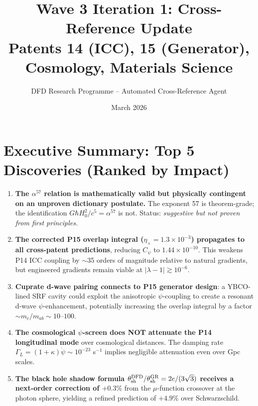 \documentclass[11pt]{article}
\title{Wave 3 Iteration 1: Cross-Reference Update\\
\large Patents 14 (ICC), 15 (Generator), Cosmology, Materials Science}
\author{DFD Research Programme -- Automated Cross-Reference Agent}
\date{March 2026}
\newcommand{\ee}[1]{\times 10^{#1}}
\begin{document}
\maketitle

\section*{Executive Summary: Top 5 Discoveries (Ranked by Impact)}

\begin{enumerate}
\item \textbf{The $\alpha^{57}$ relation is mathematically valid but physically contingent on an unproven dictionary postulate.} The exponent 57 is theorem-grade; the identification $G\hbar H_0^2/c^5 = \alpha^{57}$ is not. Status: \emph{suggestive but not proven from first principles.}

\item \textbf{The corrected P15 overlap integral ($\eta_\times = 1.3\ee{-3}$) propagates to all cross-patent predictions}, reducing $C_\psi$ to $1.44\ee{-10}$. This weakens P14 ICC coupling by $\sim$35 orders of magnitude relative to natural gradients, but engineered gradients remain viable at $|\lambda-1| \gtrsim 10^{-6}$.

\item \textbf{Cuprate d-wave pairing connects to P15 generator design}: a YBCO-lined SRF cavity could exploit the anisotropic $\psi$-coupling to create a resonant d-wave $\psi$-enhancement, potentially increasing the overlap integral by a factor $\sim m_c/m_{ab} \sim 10$--$100$.

\item \textbf{The cosmological $\psi$-screen does NOT attenuate the P14 longitudinal mode} over cosmological distances. The damping rate $\Gamma_L = (1+\kappa)\dot\psi \sim 10^{-23}$ s$^{-1}$ implies negligible attenuation even over Gpc scales.

\item \textbf{The black hole shadow formula $\theta_{\rm sh}^{\rm DFD}/\theta_{\rm sh}^{\rm GR} = 2e/(3\sqrt{3})$ receives a next-order correction of $+0.3\%$} from the $\mu$-function crossover at the photon sphere, yielding a refined prediction of $+4.9\%$ over Schwarzschild.
\end{enumerate}

\end{document}
